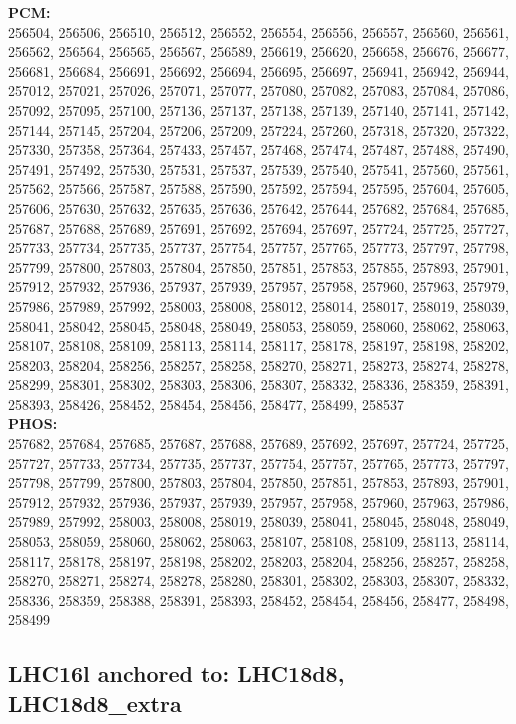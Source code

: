  \textbf{PCM:}\\
256504, 256506, 256510, 256512, 256552, 256554, 256556, 256557, 256560, 256561, 256562, 256564, 256565, 256567, 256589, 256619, 256620, 256658, 256676, 256677, 256681, 256684, 256691, 256692, 256694, 256695, 256697, 256941, 256942, 256944, 257012, 257021, 257026, 257071, 257077, 257080, 257082, 257083, 257084, 257086, 257092, 257095, 257100, 257136, 257137, 257138, 257139, 257140, 257141, 257142, 257144, 257145, 257204, 257206, 257209, 257224, 257260, 257318, 257320, 257322, 257330, 257358, 257364, 257433, 257457, 257468, 257474, 257487, 257488, 257490, 257491, 257492, 257530, 257531, 257537, 257539, 257540, 257541, 257560, 257561, 257562, 257566, 257587, 257588, 257590, 257592, 257594, 257595, 257604, 257605, 257606, 257630, 257632, 257635, 257636, 257642, 257644, 257682, 257684, 257685, 257687, 257688, 257689, 257691, 257692, 257694, 257697, 257724, 257725, 257727, 257733, 257734, 257735, 257737, 257754, 257757, 257765, 257773, 257797, 257798, 257799, 257800, 257803, 257804, 257850, 257851, 257853, 257855, 257893, 257901, 257912, 257932, 257936, 257937, 257939, 257957, 257958, 257960, 257963, 257979, 257986, 257989, 257992, 258003, 258008, 258012, 258014, 258017, 258019, 258039, 258041, 258042, 258045, 258048, 258049, 258053, 258059, 258060, 258062, 258063, 258107, 258108, 258109, 258113, 258114, 258117, 258178, 258197, 258198, 258202, 258203, 258204, 258256, 258257, 258258, 258270, 258271, 258273, 258274, 258278, 258299, 258301, 258302, 258303, 258306, 258307, 258332, 258336, 258359, 258391, 258393, 258426, 258452, 258454, 258456, 258477, 258499, 258537\\

 \textbf{PHOS:}\\
257682, 257684, 257685, 257687, 257688, 257689, 257692, 257697, 257724, 257725, 257727, 257733, 257734, 257735, 257737, 257754, 257757, 257765, 257773, 257797, 257798, 257799, 257800, 257803, 257804, 257850, 257851, 257853, 257893, 257901, 257912, 257932, 257936, 257937, 257939, 257957, 257958, 257960, 257963, 257986, 257989, 257992, 258003, 258008, 258019, 258039, 258041, 258045, 258048, 258049, 258053, 258059, 258060, 258062, 258063, 258107, 258108, 258109, 258113, 258114, 258117, 258178, 258197, 258198, 258202, 258203, 258204, 258256, 258257, 258258, 258270, 258271, 258274, 258278, 258280, 258301, 258302, 258303, 258307, 258332, 258336, 258359, 258388, 258391, 258393, 258452, 258454, 258456, 258477, 258498, 258499\\

 \subsection{LHC16l anchored to: LHC18d8, LHC18d8\_extra}

